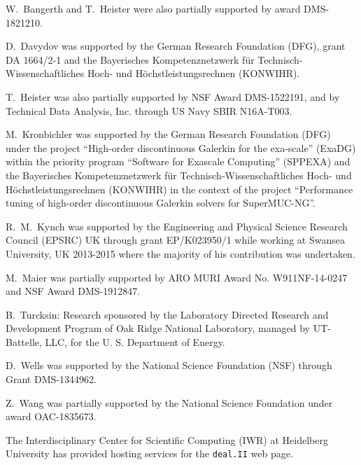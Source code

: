 \documentclass{ansarticle-preprint}
\newcommand{\specialword}[1]{\texttt{#1}}
\newcommand{\dealii}{{\specialword{deal.II}}\xspace}
\begin{document}
W.~Bangerth and T.~Heister were also partially supported by award DMS-1821210.

D.~Davydov was supported by the German Research Foundation (DFG), grant DA
1664/2-1 and the Bayerisches Kompetenznetzwerk
f\"ur Technisch-Wissenschaftliches Hoch- und H\"ochstleistungsrechnen
(KONWIHR).

T.~Heister was also partially supported by NSF Award DMS-1522191, and
by Technical Data Analysis, Inc. through US Navy SBIR N16A-T003.

M.~Kronbichler was supported by the German
Research Foundation (DFG) under the project ``High-order discontinuous
Galerkin for the exa-scale'' (\mbox{ExaDG}) within the priority program ``Software
for Exascale Computing'' (SPPEXA) and the Bayerisches Kompetenznetzwerk
f\"ur Technisch-Wissen\-schaft\-li\-ches Hoch- und H\"ochstleistungsrechnen
(KONWIHR) in the context of the project
``Performance tuning of high-order discontinuous Galerkin solvers for
SuperMUC-NG''.

R.~M.~Kynch was supported by the Engineering and Physical Science Research
Council (EPSRC) UK through grant EP/K023950/1 while working at Swansea
University, UK 2013-2015 where the majority of his contribution was
undertaken.

M.~Maier was partially supported by ARO MURI Award No. W911NF-14-0247 and
NSF Award DMS-1912847.

B.~Turcksin: Research sponsored by the Laboratory Directed Research and
Development Program of Oak Ridge National Laboratory, managed by UT-Battelle,
LLC, for the U. S. Department of Energy.

D.~Wells was supported by the National Science Foundation (NSF) through Grant
DMS-1344962.

Z.~Wang was partially
supported by the National Science Foundation under award OAC-1835673.

The Interdisciplinary Center for Scientific Computing (IWR) at Heidelberg
University has provided hosting services for the \dealii web page.


{}

\end{document}
